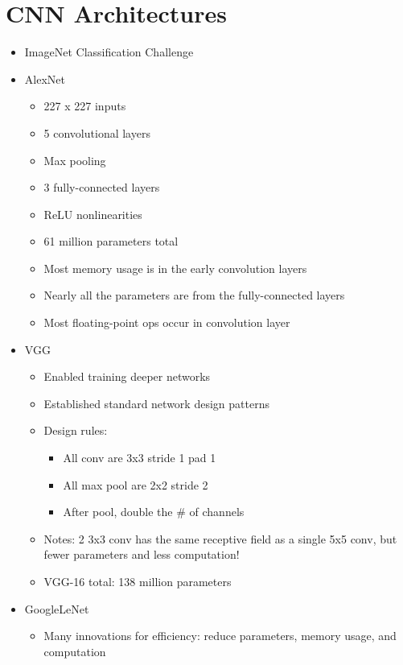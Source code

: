 \documentclass[../main.tex]{subfiles}
\begin{document}
\section{CNN Architectures}
\begin{itemize}
  \item ImageNet Classification Challenge
  \item AlexNet
  \begin{itemize}
    \item 227 x 227 inputs
    \item 5 convolutional layers
    \item Max pooling
    \item 3 fully-connected layers
    \item ReLU nonlinearities
    \item 61 million parameters total
  \end{itemize}
  \begin{itemize}
    \item Most memory usage is in the early convolution layers
    \item Nearly all the parameters are from the fully-connected layers
    \item Most floating-point ops occur in convolution layer
  \end{itemize}
  \item VGG
  \begin{itemize}
    \item Enabled training deeper networks
    \item Established standard network design patterns
    \item Design rules:
    \begin{itemize}
      \item All conv are 3x3 stride 1 pad 1
      \item All max pool are 2x2 stride 2
      \item After pool, double the \# of channels
    \end{itemize}
    \item Notes: 2 3x3 conv has the same receptive field as a single 5x5 conv, but fewer parameters and less computation!
    \item VGG-16 total: 138 million parameters
  \end{itemize}
  \item GoogleLeNet
  \begin{itemize}
    \item Many innovations for efficiency: reduce parameters, memory usage, and computation

\end{itemize}
\end{itemize}
\end{document}
